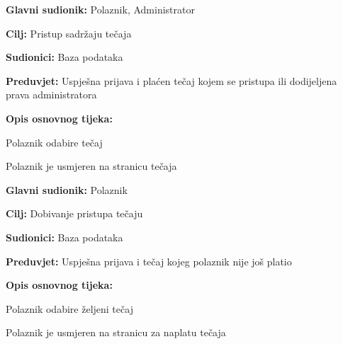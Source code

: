 				\noindent {}
				\begin{packed_item}
					
					\item \textbf{Glavni sudionik:} Polaznik, Administrator
					\item  \textbf{Cilj:} Pristup sadržaju tečaja
					\item  \textbf{Sudionici:} Baza podataka
					\item  \textbf{Preduvjet:} Uspješna prijava i plaćen tečaj kojem se pristupa ili dodijeljena prava administratora
					\item  \textbf{Opis osnovnog tijeka:}
					
					\item[] \begin{packed_enum}
						
						\item Polaznik odabire tečaj
						\item Polaznik je usmjeren na stranicu tečaja
						
					\end{packed_enum}
					
				\end{packed_item}
				\noindent \underbar{\textbf{UC6 - Upis tečaja}}
				\begin{packed_item}
					
					\item \textbf{Glavni sudionik:} Polaznik
					\item  \textbf{Cilj:} Dobivanje pristupa tečaju
					\item  \textbf{Sudionici:} Baza podataka
					\item  \textbf{Preduvjet:} Uspješna prijava i tečaj kojeg polaznik nije još platio
					\item  \textbf{Opis osnovnog tijeka:}
					
					\item[] \begin{packed_enum}
						
						\item Polaznik odabire željeni tečaj
						\item Polaznik je usmjeren na stranicu za naplatu tečaja
						
					\end{packed_enum}
					
				\end{packed_item}
			
